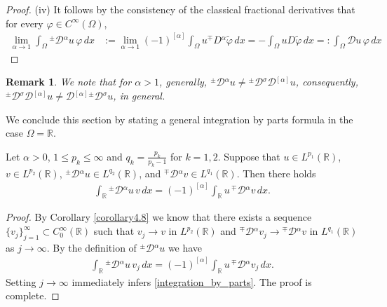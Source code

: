 \documentclass[leqno,final]{siamltex}
\numberwithin{equation}{section}
\newtheorem{remark}{Remark}[section]
\newcommand{\Ome}{{\Omega}}
\renewcommand{\(}{\bigl(}
\renewcommand{\)}{\bigr)}
\newcommand{\R}{\mathbb{R}}
\begin{document}
\begin{proof}
	  (iv)  It follows by the consistency of the classical fractional derivatives that for every $\varphi \in C^{\infty}(\Omega)$, 
		\begin{align*}
			\lim_{\alpha \rightarrow 1} \int_{\Omega} {^{\pm}}{\mathcal{D}}{^{\alpha}} u\, \varphi\,dx &:= \lim_{\alpha \rightarrow 1} (-1)^{[\alpha]} \int_{\Omega} u {^{\mp}}{D}{^{\alpha}} \tilde{\varphi} \,dx
			 = - \int_{\Omega} u D\tilde{\varphi} \,dx
			=:  \int_{\Omega} \mathcal{D} u\, \varphi \,dx
		\end{align*}
	   

    \end{proof}
    
    \begin{remark}
    	 We note that for $\alpha>1$,  generally, ${^{\pm}}{\mathcal{D}}{^{\alpha}} u
    	 \neq  {^{\pm}}{\mathcal{D}}{^{\sigma}}  {\mathcal{D}}{^{[\alpha]}}  u$, consequently, 
    	 ${^{\pm}}{\mathcal{D}}{^{\sigma}}  {\mathcal{D}}{^{[\alpha]}}  u  \neq {\mathcal{D}}{^{[\alpha]}} {^{\pm}}{\mathcal{D}}{^{\sigma}}   u$, 
    	  in general.
    \end{remark}
    
    We conclude this section by stating a general integration by parts formula in the case $\Ome=\R$. 
    
    \begin{proposition}
    	Let $\alpha>0$, $1\leq p_k\leq \infty$ and $q_k=\frac{p_k}{p_k-1}$ for $k=1,2$. Suppose that $u \in L^{p_1}(\R)$, $v\in L^{p_2}(\R)$,  ${^{\pm}}{\mathcal{D}}{^{\alpha}} u \in L^{q_2}(\R)$, and 
    		$ {^{\mp}}{\mathcal{D}}{^{\alpha}} v \in L^{q_1}(\R)$. Then there holds 
    	 \begin{align}\label{integration_by_parts} 
    	\int_{\R} {^{\pm}}{ \mathcal{\mathcal{D} }}{^{\alpha}} u\, v\,dx  
    	= (-1)^{[\alpha]} \int_{\R} u\, {^{\mp}}{\mathcal{D}}{^{\alpha}} v\,dx . 
    	\end{align}
    \end{proposition}
    
    \begin{proof}
    	By Corollary \ref{corollary4.8} we know that there exists a sequence $\{v_j\}_{j =1}^{\infty} \subset C^\infty_0(\R)$ 
    	such that $v_j\to v$ in $L^{p_2}(\R)$ and ${^{\mp}}{ \mathcal{\mathcal{D} }}{^{\alpha}} v_j \to 
    	{^{\mp}}{ \mathcal{\mathcal{D} }}{^{\alpha}} v $ in $L^{q_1}(\R)$ as $j\to \infty$. 
    	By the definition of $ {^{\pm}}{ \mathcal{\mathcal{D} }}{^{\alpha}} u$ we have 
    	 \begin{align*}
    	\int_{\R}  {^{\pm}}{ \mathcal{\mathcal{D} }}{^{\alpha}} u\, v_j\,dx 
    	= (-1)^{[\alpha]} \int_{\R} u\, {^{\mp}}{\mathcal{D} }{^{\alpha}} v_j\,dx . 
    	\end{align*}
    	Setting $j\to \infty$ immediately infers \eqref{integration_by_parts}. The proof is complete. 
    \end{proof} 
\end{document}

